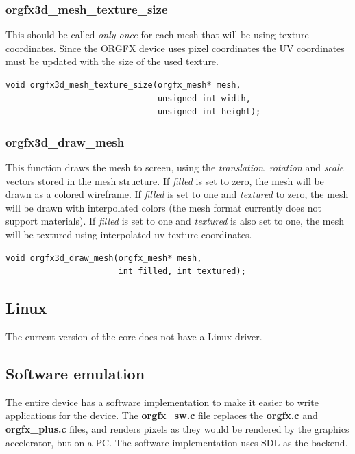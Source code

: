 \documentclass[10pt,a4paper]{article}
\begin{document}
\subsubsection{orgfx3d\_mesh\_texture\_size}
This should be called \textit{only once} for each mesh that will be using texture coordinates. Since the ORGFX device uses pixel coordinates the UV coordinates must be updated with the size of the used texture.

\begin{lstlisting}
void orgfx3d_mesh_texture_size(orgfx_mesh* mesh,
                               unsigned int width,
                               unsigned int height);
\end{lstlisting}

\subsubsection{orgfx3d\_draw\_mesh}
This function draws the mesh to screen, using the \textit{translation}, \textit{rotation} and \textit{scale} vectors stored in the mesh structure. If \textit{filled} is set to zero, the mesh will be drawn as a colored wireframe. If \textit{filled} is set to one and \textit{textured} to zero, the mesh will be drawn with interpolated colors (the mesh format currently does not support materials). If \textit{filled} is set to one and \textit{textured} is also set to one, the mesh will be textured using interpolated uv texture coordinates.

\begin{lstlisting}
void orgfx3d_draw_mesh(orgfx_mesh* mesh,
                       int filled, int textured);
\end{lstlisting}

\subsection{Linux}
The current version of the core does not have a Linux driver.

\subsection{Software emulation}
The entire device has a software implementation to make it easier to write applications for the device. The \textbf{orgfx\_sw.c} file replaces the \textbf{orgfx.c} and \textbf{orgfx\_plus.c} files, and renders pixels as they would be rendered by the graphics accelerator, but on a PC. The software implementation uses SDL as the backend.
\end{document}
